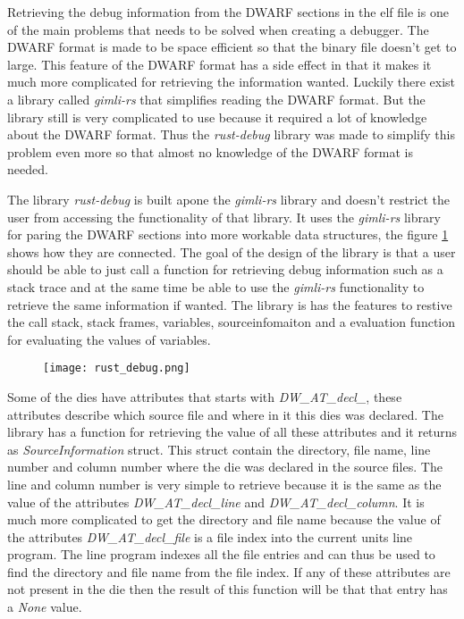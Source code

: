 
Retrieving the debug information from the \gls{DWARF} sections in the \gls{elf} file is one of the main problems that needs to be solved when creating a debugger.
The \gls{DWARF} format is made to be space efficient so that the binary file doesn't get to large.
This feature of the \gls{DWARF} format has a side effect in that it makes it much more complicated for retrieving the information wanted.
Luckily there exist a library called \emph{gimli-rs} that simplifies reading the \gls{DWARF} format.
But the library still is very complicated to use because it required a lot of knowledge about the \gls{DWARF} format.
Thus the \emph{rust-debug} library was made to simplify this problem even more so that almost no knowledge of the \gls{DWARF} format is needed.


The library \emph{rust-debug} is built apone the \emph{gimli-rs} library and doesn't restrict the user from accessing the functionality of that library.
It uses the \emph{gimli-rs} library for paring the \gls{DWARF} sections into more workable data structures, the figure \ref{fig:rustdebug} shows how they are connected.
The goal of the design of the library is that a user should be able to just call a function for retrieving debug information such as a stack trace and at the same time be able to use the \emph{gimli-rs} functionality to retrieve the same information if wanted.
The library is has the features to restive the call stack, stack frames, variables, sourceinfomaiton and a evaluation function for evaluating the values of variables.


\begin{figure}[h]
    \centering
    \texttt{[image: rust\_debug.png]}
    \label{fig:rustdebug}
\end{figure}


Some of the dies have attributes that starts with \emph{DW\_AT\_decl\_}, these attributes describe which source file and where in it this dies was declared.
The library has a function for retrieving the value of all these attributes and it returns as \emph{SourceInformation} struct.
This struct contain the directory, file name, line number and column number where the die was declared in the source files.
The line and column number is very simple to retrieve because it is the same as the value of the attributes \emph{DW\_AT\_decl\_line} and \emph{DW\_AT\_decl\_column}.
It is much more complicated to get the directory and file name because the value of the attributes \emph{DW\_AT\_decl\_file} is a file index into the current units line program.
The line program indexes all the file entries and can thus be used to find the directory and file name from the file index.
If any of these attributes are not present in the die then the result of this function will be that that entry has a \emph{None} value.




